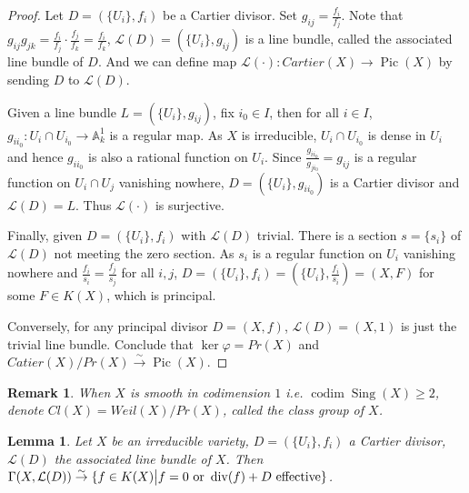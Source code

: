 \documentclass{ctexart}
\newtheorem{remark}{Remark}[section]
\newtheorem{lemma}{Lemma}[section]
\newcommand{\codim}{\operatorname{codim}}
\newcommand{\singular}{\operatorname{Sing}}
\newcommand{\picardscheme}{\operatorname{Pic}}
\newcommand{\divisor}{\operatorname{div}}
\begin{document}
\begin{proof}
    Let $D = (\{U_{i}\}, f_{i})$ be a Cartier divisor.
    Set $g_{ij} = \frac{f_{i}}{f_{j}}$.
    Note that $g_{ij}g_{jk} = \frac{f_{i}}{f_{j}} \cdot \frac{f_{j}}{f_{k}} = \frac{f_{i}}{f_{k}}$,
    $\mathcal{L}(D) = (\{U_{i}\}, g_{ij})$ is a line bundle, called the associated line bundle of $D$.
    And we can define map $\mathcal{L}(\cdot): Cartier(X) \rightarrow \picardscheme (X)$ by sending $D$ to $\mathcal{L}(D)$.
    \par
    Given a line bundle $L = (\{U_{i}\}, g_{ij})$, fix $i_{0}\in I$,
    then for all $i\in I$, $g_{ii_{0}}: U_{i} \cap U_{i_{0}} \rightarrow \mathbb{A}_{k}^{1}$ is a regular map.
    As $X$ is irreducible, $U_{i} \cap U_{i_{0}}$ is dense in $U_{i}$ and hence $g_{ii_{0}}$ is also a rational function on $U_{i}$.
    Since $\frac{g_{ii_{0}}}{g_{ji_{0}}} = g_{ij}$ is a regular function on $U_{i} \cap U_{j}$ vanishing nowhere, $D = (\{U_{i}\}, g_{ii_{0}})$ is a Cartier divisor and $\mathcal{L}(D) = L$.
    Thus $\mathcal{L}(\cdot)$ is surjective.
    \par
    Finally, given $D = (\{U_{i}\}, f_{i})$ with $\mathcal{L}(D)$ trivial.
    There is a section $s = \{s_{i}\}$ of $\mathcal{L}(D)$ not meeting the zero section.
    As $s_{i}$ is a regular function on $U_{i}$ vanishing nowhere and $\frac{f_{i}}{s_{i}} = \frac{f_{j}}{s_{j}}$ for all $i,j$, 
    $D = (\{U_{i}\}, f_{i}) = (\{U_{i}\}, \frac{f_{i}}{s_{i}}) = (X, F)$ for some $F\in K(X)$, which is principal.
    \par
    Conversely, for any principal divisor $D = (X, f)$,
    $\mathcal{L}(D) = (X, 1)$ is just the trivial line bundle.
    Conclude that $\ker \varphi = Pr(X)$ and $Catier(X)/Pr(X) \overset{\sim}{\rightarrow} \picardscheme (X)$.
\end{proof}
\begin{remark}
    When $X$ is smooth in codimension $1$ i.e. $\codim \singular (X) \ge 2$,
    denote $Cl(X) = Weil(X)/Pr(X)$, called the class group of $X$.
\end{remark}
\begin{lemma}
    Let $X$ be an irreducible variety, $D = (\{U_{i}\}, f_{i})$ a Cartier divisor, $\mathcal{L}(D)$ the associated line bundle of $X$.
    Then $\Gamma(X, \mathcal{L}(D)) \overset{\sim}{\rightarrow} \{f\in K(X) \big{|} f = 0 \text{ or } \divisor (f) + D \text{ effective}\}$.
    \label{Lemma 7.5}
\end{lemma}
\vspace{-1.5\baselineskip} %
\end{document}
